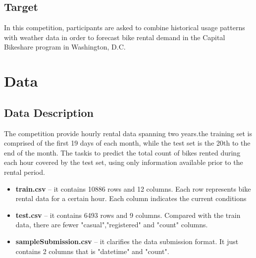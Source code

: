 \documentclass{amsart}
\begin{document}
\subsection{Target}
In this competition, participants are asked to combine historical usage patterns with weather data in order to forecast bike rental demand in the Capital Bikeshare program in Washington, D.C.

\section{Data} \label{sec-preliminaries}
\subsection{Data Description}
The competition provide hourly rental data spanning two years.the training set is comprised of the first 19 days of each month, while the test set is the 20th to the end of the month. The taskis to predict the total count of bikes rented during each hour covered by the test set, using only information available prior to the rental period.\\

\begin{itemize}
	\smallskip
	\item \textbf{train.csv} -- it contains 10886 rows and 12 columns. Each row represents bike rental data for a certain hour. Each column indicates the current conditions
	\smallskip
	\item \textbf{test.csv} -- it contains 6493 rows and 9 columns. Compared with the train data, there are fewer "casual","registered" and "count" columns.
	\smallskip
	\item \textbf{sampleSubmission.csv} -- it clarifies the data submission format. It just contains 2 columns that is "datetime" and "count".
\end{itemize}
\end{document}
